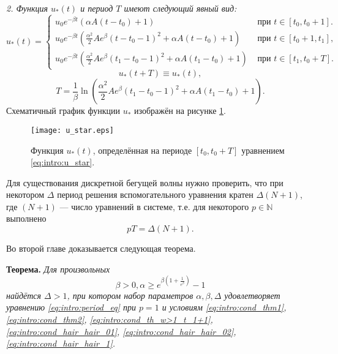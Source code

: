 \textit{2. Функция $u_*(t)$ и период $T$ имеют следующий явный вид:}
%
\small
\begin{equation}
	\label{eq:intro:u_star}
	u_*(t)=
	\begin{cases}
		u_0 e^{-\beta t}(\alpha A(t-t_0)+1) & \text{ при } t\in[t_0,t_0+1].
		\\
		u_0 e^{-\beta t}\left(\frac{\alpha^2}{2}Ae^{\beta}(t-t_0-1)^2+\alpha A(t-t_0)+1\right) & \text{ при } t\in[t_0+1,t_1],
		\\
		u_0 e^{-\beta t}\left(\frac{\alpha^2}{2}Ae^{\beta}(t_1-t_0-1)^2+\alpha A(t_1-t_0)+1\right) & \text{ при } t\in[t_1,t_0+T].
	\end{cases}
\end{equation}
\normalsize
%
\[
u_*(t + T) \equiv u_*(t),
\]
%
\begin{equation}
	\label{eq:intro:mg_period_T}
	T = \dfrac{1}{\beta}\ln\left( \frac{\alpha^2}{2}Ae^{\beta}(t_1-t_0-1)^2+\alpha A(t_1-t_0)+1\right). 
\end{equation}
%
Схематичный график функции $u_*$ изображён на рисунке \ref{fig:intro:u_star}.
%
\begin{figure}[h]
	\centering
	\texttt{[image: u\_star.eps]}
	\caption{Функция $u_*(t)$, определённая на периоде $[t_0, t_0 + T]$ уравнением \eqref{eq:intro:u_star}.}
	\label{fig:intro:u_star}
\end{figure}

Для существования дискретной бегущей волны нужно проверить, что при некотором $\Delta$ период решения вспомогательного уравнения кратен $\Delta (N + 1)$, где $(N + 1)$ --- число уравнений в системе, т.е. для некоторого $p \in \mathbb{N}$ выполнено
\begin{equation}
	\label{eq:intro:period_eq}
	pT = \Delta (N + 1).
\end{equation}

Во второй главе доказывается следующая теорема.

\textbf{Теорема.} \textit{Для произвольных 
	\begin{equation}
		\label{eq:intro:constraints_parameters_final}
		\beta > 0, \alpha \geq e^{\beta\left(1 + \frac{1}{e^{\beta}}\right)} - 1
	\end{equation}
	найдётся $\Delta > 1$, при котором набор параметров $\alpha, \beta, \Delta$ удовлетворяет уравнению \eqref{eq:intro:period_eq} при $p = 1$ и условиям \eqref{eq:intro:cond_thm1}, \eqref{eq:intro:cond_thm2}, \eqref{eq:intro:cond_th_w>1_t_1+1}, \eqref{eq:intro:cond_hair_hair_01}, \eqref{eq:intro:cond_hair_hair_02}, \eqref{eq:intro:cond_hair_hair_1}.}

